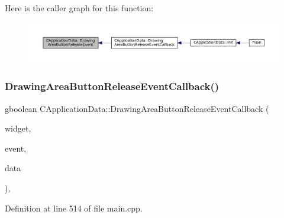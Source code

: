 Here is the caller graph for this function\+:
\nopagebreak
\begin{figure}[H]
\begin{center}
\leavevmode
\includegraphics[width=350pt]{classCApplicationData_a7df4d71ef6fabf7eac740c95cfe3cd81_icgraph}
\end{center}
\end{figure}
\hypertarget{classCApplicationData_a2708d2083c8c2e7c8de126b40eb17b3f}{}\label{classCApplicationData_a2708d2083c8c2e7c8de126b40eb17b3f} 
\subsubsection{\texorpdfstring{Drawing\+Area\+Button\+Release\+Event\+Callback()}{DrawingAreaButtonReleaseEventCallback()}}
{\footnotesize\ttfamily gboolean C\+Application\+Data\+::\+Drawing\+Area\+Button\+Release\+Event\+Callback (\begin{DoxyParamCaption}\item[{Gtk\+Widget $\ast$}]{widget,  }\item[{Gdk\+Event\+Button $\ast$}]{event,  }\item[{gpointer}]{data }\end{DoxyParamCaption})\hspace{0.3cm}{\ttfamily [static]}, {\ttfamily [protected]}}



Definition at line 514 of file main.\+cpp.


